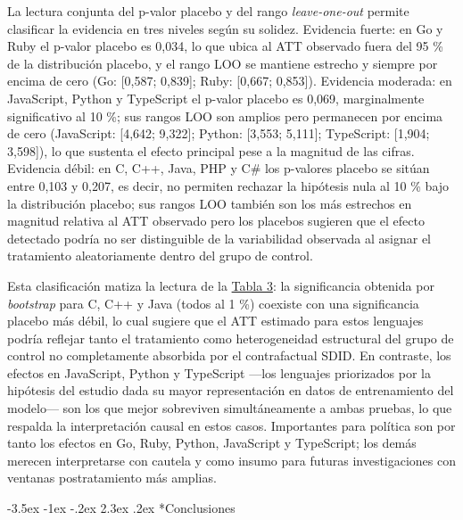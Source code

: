 \documentclass[12pt,a4paper]{article}
\makeatletter
\let\textbf\textmd
\renewcommand\section{\@startsection{section}{1}{\z@}%
  {-3.5ex \@plus -1ex \@minus -.2ex}%
  {2.3ex \@plus.2ex}%
  {\normalfont\normalsize}}
\makeatother
\begin{document}
La lectura conjunta del p-valor placebo y del rango \textit{leave-one-out} permite clasificar la evidencia en tres niveles según su solidez. \textbf{Evidencia fuerte}: en Go y Ruby el p-valor placebo es 0,034, lo que ubica al ATT observado fuera del 95 \% de la distribución placebo, y el rango LOO se mantiene estrecho y siempre por encima de cero (Go: [0,587; 0,839]; Ruby: [0,667; 0,853]). \textbf{Evidencia moderada}: en JavaScript, Python y TypeScript el p-valor placebo es 0,069, marginalmente significativo al 10 \%; sus rangos LOO son amplios pero permanecen por encima de cero (JavaScript: [4,642; 9,322]; Python: [3,553; 5,111]; TypeScript: [1,904; 3,598]), lo que sustenta el efecto principal pese a la magnitud de las cifras. \textbf{Evidencia débil}: en C, C++, Java, PHP y C\# los p-valores placebo se sitúan entre 0,103 y 0,207, es decir, no permiten rechazar la hipótesis nula al 10 \% bajo la distribución placebo; sus rangos LOO también son los más estrechos en magnitud relativa al ATT observado pero los placebos sugieren que el efecto detectado podría no ser distinguible de la variabilidad observada al asignar el tratamiento aleatoriamente dentro del grupo de control.

Esta clasificación matiza la lectura de la \hyperref[tab:tabla3]{Tabla 3}: la significancia obtenida por \textit{bootstrap} para C, C++ y Java (todos al 1 \%) coexiste con una significancia placebo más débil, lo cual sugiere que el ATT estimado para estos lenguajes podría reflejar tanto el tratamiento como heterogeneidad estructural del grupo de control no completamente absorbida por el contrafactual SDID. En contraste, los efectos en JavaScript, Python y TypeScript —los lenguajes priorizados por la hipótesis del estudio dada su mayor representación en datos de entrenamiento del modelo— son los que mejor sobreviven simultáneamente a ambas pruebas, lo que respalda la interpretación causal en estos casos. Importantes para política son por tanto los efectos en Go, Ruby, Python, JavaScript y TypeScript; los demás merecen interpretarse con cautela y como insumo para futuras investigaciones con ventanas postratamiento más amplias.

\clearpage
{}
\label{sec:conc}
\section*{\centering\normalfont Conclusiones}
\end{document}

